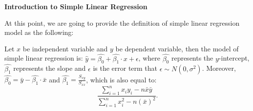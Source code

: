 \textbf{Introduction to Simple Linear Regression}

At this point, we are going to provide the definition of simple linear regression model as the following:

\begin{definition}
Let $x$ be independent variable and $y$ be dependent variable, then the model of simple linear regression is: $\hat{y} = \hat{\beta_0} + \hat{\beta_1} \cdot x + \epsilon$, where $\hat{\beta_0}$ represents the $y$-intercept, $\hat{\beta_1}$ represents the slope and $\epsilon$ is the error term that $\epsilon \sim N(0, \sigma^2)$. Moreover, $\hat{\beta_0} = \bar{y} - \hat{\beta_1}\cdot \bar{x}$ and $\hat{\beta_1} = \frac{S_{xy}}{S_{xx}}$, which is also equal to: \[ \frac{\sum_{i=1}^{n}x_iy_i - n\bar{x}\bar{y}}{\sum_{i=1}^{n}x_i^2 - n(\bar{x})^2}.\]
\end{definition}

